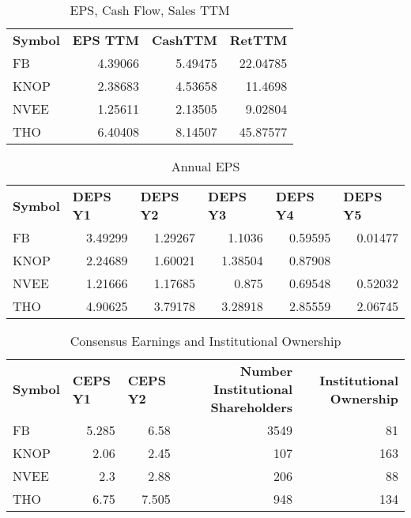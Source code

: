 \documentclass{article}
\begin{document}
\begin{table}[htbp]
  \caption{EPS, Cash Flow, Sales TTM}
    \begin{tabular}{lrrr}
    \textbf{Symbol} & \multicolumn{1}{l}{\textbf{EPS TTM}} & \multicolumn{1}{l}{\textbf{CashTTM}} & \multicolumn{1}{l}{\textbf{RetTTM}} \\
    FB    & 4.39066 & 5.49475 & 22.04785 \\
    KNOP  & 2.38683 & 4.53658 & 11.4698 \\
    NVEE  & 1.25611 & 2.13505 & 9.02804 \\
    THO   & 6.40408 & 8.14507 & 45.87577 \\
    \end{tabular}%
  \label{tab:addlabel}%
\end{table}%

\begin{table}[htbp]
  \caption{Annual EPS}
    \begin{tabular}{lrrrrr}
    \textbf{Symbol} & \multicolumn{1}{l}{\textbf{DEPS Y1}} & \multicolumn{1}{l}{\textbf{DEPS Y2}} & \multicolumn{1}{l}{\textbf{DEPS Y3}} & \multicolumn{1}{l}{\textbf{DEPS Y4}} & \multicolumn{1}{l}{\textbf{DEPS Y5}} \\
   FB    & 3.49299 & 1.29267 & 1.1036 & 0.59595 & 0.01477 \\
    KNOP  & 2.24689 & 1.60021 & 1.38504 & 0.87908 &  \\
    NVEE  & 1.21666 & 1.17685 & 0.875 & 0.69548 & 0.52032 \\
    THO   & 4.90625 & 3.79178 & 3.28918 & 2.85559 & 2.06745 \\
    \end{tabular}%
  \label{tab:addlabel}%
\end{table}%

\begin{table}[htbp]
  \caption{Consensus Earnings and Institutional Ownership}
    \begin{tabular}{lrrrr}
    \textbf{Symbol} & \multicolumn{1}{l}{\textbf{CEPS Y1}} & \multicolumn{1}{l}{\textbf{CEPS Y2}} & \multicolumn{1}{p{4.215em}}{\textbf{Number Institutional Shareholders}} & \multicolumn{1}{p{4.215em}}{\textbf{Institutional Ownership}} \\
    FB    & 5.285 & 6.58  & 3549  & 81 \\
    KNOP  & 2.06  & 2.45  & 107   & 163 \\
    NVEE  & 2.3   & 2.88  & 206   & 88 \\
    THO   & 6.75  & 7.505 & 948   & 134 \\
    \end{tabular}%
  \label{tab:addlabel}%
\end{table}%
\end{document}
